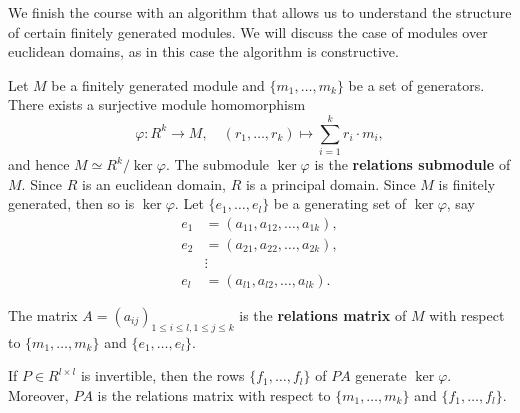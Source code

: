 
We finish the course with an algorithm that allows us to understand the
structure of certain finitely generated modules.  We will discuss the case of
modules over euclidean domains, as in this case the algorithm is constructive. 


Let $M$ be a finitely generated module and $\{m_1,\dots,m_k\}$ be a set of
generators.  There exists a surjective module homomorphism 
\[
	\varphi\colon R^k\to M, 
	\quad
	(r_1,\dots,r_k)\mapsto \sum_{i=1}^k r_i\cdot m_i,
\]
and hence 
$M\simeq R^k/\ker\varphi$. 
The submodule $\ker\varphi$ is the \textbf{relations submodule} of $M$. 
Since $R$ is an euclidean domain, $R$ is a principal domain. Since 
$M$ is finitely generated, then so is $\ker\varphi$. Let 
$\{e_1,\dots,e_l\}$ be a generating set of $\ker\varphi$, say 
\begin{align*}
e_1&=(a_{11},a_{12},\dots,a_{1k}),\\
e_2&=(a_{21},a_{22},\dots,a_{2k}),\\
&\vdots\\
e_l&=(a_{l1},a_{l2},\dots,a_{lk}).	
\end{align*}

The matrix $A=(a_{ij})_{1\leq i\leq l,1\leq j\leq k}$ is the 
\textbf{relations matrix} of $M$ with respect to $\{m_1,\dots,m_k\}$ 
and $\{e_1,\dots,e_l\}$. 

\begin{claim}
		If $P\in R^{l\times l}$ is invertible, then the rows
		$\{f_1,\dots,f_l\}$ of $PA$ generate $\ker\varphi$. Moreover, $PA$ is
		the relations matrix with respect to $\{m_1,\dots,m_k\}$ and
		$\{f_1,\dots,f_l\}$. 
\end{claim}


